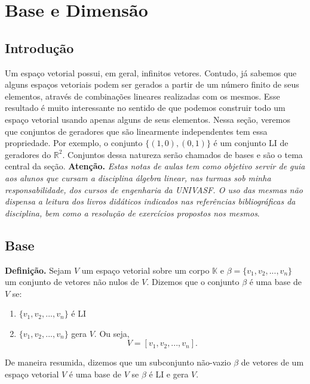 \chapter{Base e Dimensão}
\thispagestyle{empty}


\section{Introdução}

Um espaço vetorial possui, em geral, infinitos vetores. Contudo, já sabemos que alguns espaços vetoriais podem ser gerados a partir de um número finito de seus elementos, através de combinações lineares realizadas com os mesmos. Esse resultado é muito interessante no sentido de que podemos  construir todo um espaço vetorial usando apenas alguns  de seus elementos.  Nessa seção, veremos que conjuntos de geradores que são  linearmente independentes tem essa propriedade. Por exemplo, o conjunto $\{ (1,0), (0,1)\}$  é um conjunto LI de geradores do $\mathbb{R}^2$.  Conjuntos dessa natureza serão chamados de bases e são o tema central da seção.
 \textbf{Atenção.} \textit{Estas notas de aulas tem como objetivo servir de guia  aos alunos que cursam a disciplina álgebra linear, nas turmas sob minha responsabilidade, dos cursos de engenharia da UNIVASF. O uso das mesmas  não dispensa  a leitura  dos livros didáticos indicados nas referências bibliográficas da disciplina, bem como a resolução de exercícios propostos nos mesmos}.

\section{Base}


\textbf{Definição.} Sejam $V$ um espaço vetorial sobre um corpo $\mathbb{K}$ e  $\beta=\{v_1, v_2,..., v_n\}$  um conjunto de vetores não nulos de $V$.  Dizemos que o conjunto $\beta$ é uma base de $V$ se:




\begin{enumerate}[label=(\roman*)]
\item   $\{v_1, v_2,..., v_n\}$ é  LI
\item $\{v_1, v_2,..., v_n\}$  gera $V$. Ou seja, $$ V=[v_1, v_2,..., v_n].$$

\end{enumerate}




\vspace{0.3cm}
De maneira resumida, dizemos que um subconjunto  não-vazio $\beta$ de vetores de um espaço vetorial  $V$  é uma base de $V$ se  $\beta$ é LI e gera $V$.

